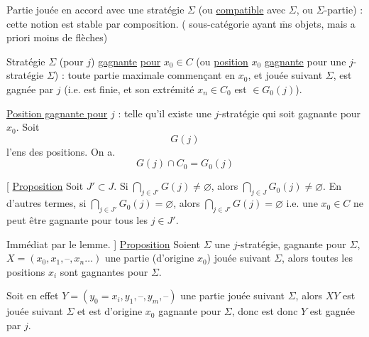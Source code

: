

Partie jouée en accord avec une stratégie $\Sigma$ (ou \uline{compatible} avec $\Sigma$, ou $\Sigma$-partie) : cette notion est stable par composition. ( sous-catégorie ayant $\overline{\mathrm m}$s objets, mais a priori moins de flèches)


Stratégie $\Sigma$ (pour $j$) \uline{gagnante} \uline{pour} $x_0\in C$ (ou \uline{position} $x_0$ \uline{gagnante} pour une $j$-stratégie $\Sigma$) : toute partie maximale commençant en $x_0$, et jouée suivant $\Sigma$, est gagnée par $j$ (i.e. est finie, et son extrémité $x_n\in C_0$ est $\in G_0(j)$).

\uline{Position  gagnante pour} $j$ : telle qu'il existe une $j$-stratégie qui soit gagnante pour $x_0$. Soit
\[
 G(j)
\]
l'ens des  positions. On a.
\[
 G(j)\cap C_0=G_0(j)
\]

[ \uline{Proposition} Soit $J'\subset J$.  Si $\displaystyle\bigcap_{j\in J'}G(j)\ne\varnothing$, alors $\displaystyle\bigcap_{j\in J}G_0(j)\ne\varnothing$. En d'autres termes, si $\displaystyle\bigcap_{j\in J'}G_0(j)=\varnothing$, alors $\displaystyle\bigcap_{j\in J'}G(j)=\varnothing$ i.e. une $x_0\in C$ ne peut être gagnante pour tous les $j\in J'$.

Immédiat par le lemme. ]
\uline{Proposition} Soient $\Sigma$ une $j$-stratégie,  gagnante pour $\Sigma$, $X=(x_0,x_1,\text{--},x_n\ldots)$ une partie (d'origine $x_0$) jouée suivant $\Sigma$, alors toutes les positions $x_i$ sont gagnantes pour $\Sigma$.

Soit en effet $Y=(y_0=x_i,y_1,\text{--},y_m,\text{--})$ une partie  jouée suivant $\Sigma$,  alors $XY$ est jouée suivant $\Sigma$ et est d'origine $x_0$ gagnante pour $\Sigma$, donc est  donc $Y$ est gagnée par $j$.

